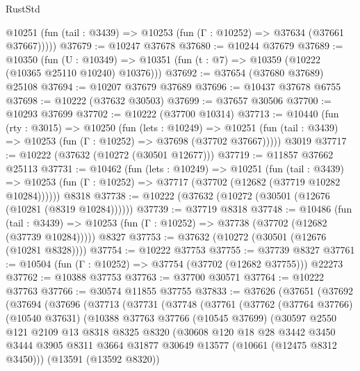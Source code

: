 \begin{lexlean}{RustStd}
\begin{coremodule}
      @10251 (fun (tail : @3439) => @10253 (fun (Γ : @10252) => @37634 (@37661 @37667)))))
@37679 := @10247 @37678
@37680 := @10244 @37679
@37689 := @10350
    (fun (U : @10349) => @10351 (fun (t : @7) => @10359 (@10222 (@10365 @25110 @10240) @10376)))
@37692 := @37654 (@37680 @37689) @25108
@37694 := @10207 @37679 @37689
@37696 := @10437 @37678 @6755
@37698 := @10222 (@37632 @30503)
@37699 := @37657 @30506
@37700 := @10293 @37699
@37702 := @10222 (@37700 @10314)
@37713 := @10440
    (fun (rty : @3015) =>
    @10250
      (fun (lets : @10249) =>
      @10251 (fun (tail : @3439) => @10253 (fun (Γ : @10252) => @37698 (@37702 @37667)))))
    @3019
@37717 := @10222 (@37632 (@10272 (@30501 @12677)))
@37719 := @11857 @37662 @25113
@37731 := @10462
    (fun (lets : @10249) =>
    @10251
      (fun (tail : @3439) =>
      @10253 (fun (Γ : @10252) => @37717 (@37702 (@12682 (@37719 @10282 @10284))))))
    @8318
@37738 := @10222 (@37632 (@10272 (@30501 (@12676 (@10281 (@8319 @10284))))))
@37739 := @37719 @8318
@37748 := @10486
    (fun (tail : @3439) => @10253 (fun (Γ : @10252) => @37738 (@37702 (@12682 (@37739 @10284)))))
    @8327
@37753 := @37632 (@10272 (@30501 (@12676 (@10281 @8328))))
@37754 := @10222 @37753
@37755 := @37739 @8327
@37761 := @10504 (fun (Γ : @10252) => @37754 (@37702 (@12682 @37755))) @22273
@37762 := @10388 @37753
@37763 := @37700 @30571
@37764 := @10222 @37763
@37766 := @30574 @11855 @37755
@37833 := @37626
    (@37651
      (@37692
        (@37694
          (@37696
            (@37713
              (@37731
                (@37748
                  (@37761
                    (@37762
                      (@37764 @37766)
                      (@10540 @37631)
                      (@10388
                        @37763
                        @37766
                        (@10545 @37699)
                        (@30597
                          @2550
                          @121
                          @2109
                          @13
                          @8318
                          @8325
                          @8320
                          (@30608
                            @120
                            @18
                            @28
                            @3442
                            @3450
                            @3444
                            @3905
                            @8311
                            @3664
                            @31877
                            @30649
                            @13577
                            (@10661 (@12475 @8312 @3450)))
                          (@13591 (@13592 @8320))

\end{coremodule}
\end{lexlean}
